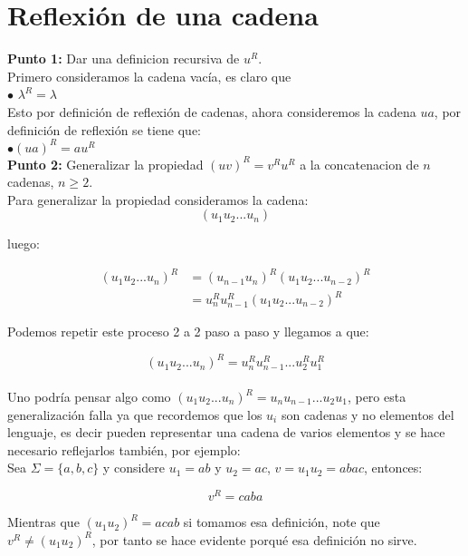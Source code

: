 
\section{Reflexión de una cadena}

\textbf{Punto 1: }Dar una definicion recursiva de $u^R.$\\

 Primero consideramos la cadena vacía, es claro que \\

\quad $\bullet$ $\lambda^R=\lambda$\\

Esto por definición de reflexión de cadenas, ahora consideremos la cadena $ua$, por definición de reflexión se tiene que:\\

\quad $\bullet (ua)^R=au^R$\\

\textbf{Punto 2: }Generalizar la propiedad $(uv)^R=v^Ru^R$ a la concatenacion de $n$ cadenas, $n\geq2$.\\

 Para generalizar la propiedad consideramos la cadena:\\

$$(u_1u_2...u_n)$$

luego:

\begin{align*}
(u_1u_2...u_n)^R&=(u_{n-1}u_n)^R(u_1u_2...u_{n-2})^R\\
&=u_n^Ru_{n-1}^R(u_1u_2...u_{n-2})^R
\end{align*}


Podemos repetir este proceso 2 a 2 paso a paso y llegamos a que:

$$(u_1u_2...u_n)^R=u_n^Ru_{n-1}^R...u_2^Ru_1^R$$\\

Uno podría pensar algo como $(u_1u_2...u_n)^R=u_nu_{n-1}...u_2u_1$, pero esta generalización falla ya que recordemos que los $u_i$ son cadenas y no elementos del lenguaje, es decir pueden representar una cadena de varios elementos y se hace necesario reflejarlos también, por ejemplo:\\

Sea $\Sigma=\{a,b,c\}$ y considere $u_1=ab$ y $u_2=ac$, $v=u_1u_2=abac$, entonces:

$$v^R=caba$$

Mientras que $(u_1u_2)^R=acab$ si tomamos esa definición, note que $v^R\neq (u_1u_2)^R$, por tanto se hace evidente porqué esa definición no sirve.

